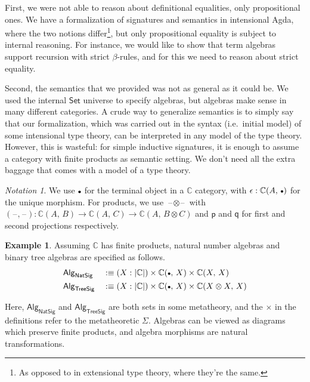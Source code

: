 \documentclass[12pt,a4paper,twoside,openany]{book}
\theoremstyle{remark}
\newtheorem{notation}{Notation}
\theoremstyle{definition}
\newtheorem{myexample}{Example}
\newcommand{\ms}[1]{\mathsf{#1}}
\newcommand{\mbb}[1]{\mathbb{#1}}
\newcommand{\blank}{\mathord{\hspace{1pt}\text{--}\hspace{1pt}}}
\newcommand{\Set}{\mathsf{Set}}
\newcommand{\emptycon}{\scaleobj{.75}\bullet}
\newcommand{\p}{\mathsf{p}}
\newcommand{\q}{\mathsf{q}}
\newcommand{\Alg}{\ms{Alg}}
\newcommand{\mbbC}{\mbb{C}}
\newcommand{\defn}{:\equiv}
\begin{document}
First, we were not able to reason about definitional equalities, only
propositional ones. We have a formalization of signatures and semantics in
intensional Agda, where the two notions differ\footnote{As opposed to in
extensional type theory, where they're the same.}, but only propositional
equality is subject to internal reasoning. For instance, we would like to show
that term algebras support recursion with strict $\beta$-rules, and for this we
need to reason about strict equality.

Second, the semantics that we provided was not as general as it could be. We
used the internal $\Set$ universe to specify algebras, but algebras make sense
in many different categories. A crude way to generalize semantics is to simply
say that our formalization, which was carried out in the syntax (i.e.\ initial
model) of some intensional type theory, can be interpreted in any model of the
type theory. However, this is wasteful: for simple inductive signatures, it is
enough to assume a category with finite products as semantic setting. We don't
need all the extra baggage that comes with a model of a type theory.

\begin{notation}
We use $\emptycon$ for the terminal object in a $\mbb{C}$ category, with
$\epsilon : \mbb{C}(A,\,\emptycon)$ for the unique morphism. For products, we
use $\blank\!\otimes\!\blank$ with $(\blank\!,\!\blank) : \mbb{C}(A,\,B) \to
\mbb{C}(A,\,C) \to \mbb{C}(A,\,B\otimes C)$ and $\p$ and $\q$ for
first and second projections respectively.
\end{notation}

\begin{myexample}
Assuming $\mbbC$ has finite products, natural number algebras and binary tree
algebras are specified as follows.
\begin{alignat*}{3}
  &\Alg_{\ms{NatSig}} &&\defn (X : |\mbbC|) \times \mbbC(\emptycon,\,X) \times \mbbC(X,\,X)\\
  &\Alg_{\ms{TreeSig}}&& \defn (X : |\mbbC|) \times \mbbC(\emptycon,\,X) \times \mbbC(X \otimes X,\,X)
\end{alignat*}
\end{myexample}
Here, $\Alg_{\ms{NatSig}}$ and $\Alg_{\ms{TreeSig}}$ are both sets in some
metatheory, and the $\times$ in the definitions refer to the metatheoretic
$\Sigma$. Algebras can be viewed as diagrams which preserve finite products, and
algebra morphisms are natural transformations.
\end{document}

